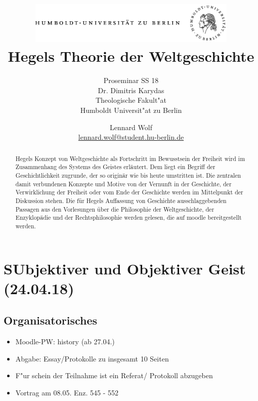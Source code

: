 \documentclass[emulatestandardclasses]{scrartcl}
\date{\vspace{-3ex}}
\begin{document}
\title{
	\includegraphics*[width=0.75\textwidth]{ErstesSem/images/hu_logo.png}\\
	\vspace{24pt}
	Hegels Theorie der Weltgeschichte}
\subtitle{Proseminar SS 18\\
          Dr. Dimitris Karydas\\
          Theologische Fakult"at \\ 
          Humboldt Universit"at zu Berlin}
\author{Lennard Wolf\\
        \small{\href{mailto:lennard.wolf@student.hu-berlin.de}{lennard.wolf@student.hu-berlin.de}}}
\maketitle
\begin{abstract}

Hegels Konzept von Weltgeschichte als Fortschritt im Bewusstsein der Freiheit wird im Zusammenhang des Systems des Geistes erläutert. Dem liegt ein Begriff der Geschichtlichkeit zugrunde, der so originär wie bis heute umstritten ist. Die zentralen damit verbundenen Konzepte und Motive von der Vernunft in der Geschichte, der Verwirklichung der Freiheit oder vom Ende der Geschichte werden im Mittelpunkt der Diskussion stehen. Die für Hegels Auffassung von Geschichte ausschlaggebenden Passagen aus den Vorlesungen über die Philosophie der Weltgeschichte, der Enzyklopädie und der Rechtsphilosophie werden gelesen, die auf moodle bereitgestellt werden.
\end{abstract}
\newpage

\tableofcontents
\listoffigures
\newpage


\section{SUbjektiver und Objektiver Geist\\(24.04.18)}

\subsection{Organisatorisches}

\begin{itemize}
  \item Moodle-PW: history (ab 27.04.)
  \item Abgabe: Essay/Protokolle zu insgesamt 10 Seiten
  \item F"ur schein der Teilnahme ist ein Referat/ Protokoll abzugeben
  \item Vortrag am 08.05. Enz. 545 - 552
\end{itemize}
\end{document}
